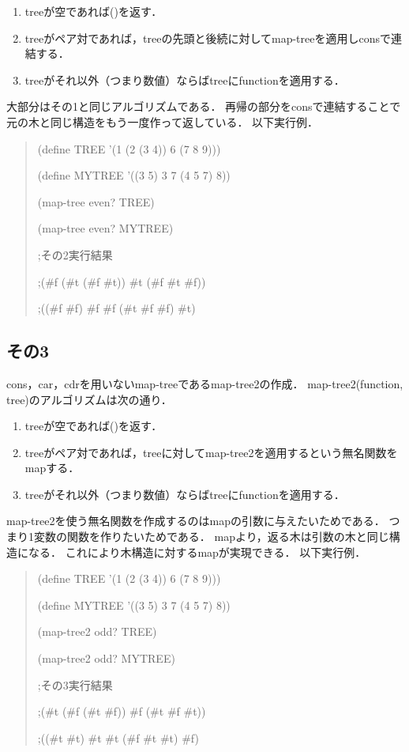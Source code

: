 \begin{enumerate}
\item treeが空であれば()を返す．
\item treeがペア対であれば，treeの先頭と後続に対してmap-treeを適用しconsで連結する．
\item treeがそれ以外（つまり数値）ならばtreeにfunctionを適用する．
\end{enumerate}

大部分はその1と同じアルゴリズムである．
再帰の部分をconsで連結することで元の木と同じ構造をもう一度作って返している．
以下実行例．

\begin{quote}

  (define TREE '(1 (2 (3 4)) 6 (7 8 9)))
  
  (define MYTREE '((3 5) 3 7 (4 5 7) 8))
  
  (map-tree even? TREE)
  
  (map-tree even? MYTREE)
  
  ;その2実行結果
  
  ;(\#f (\#t (\#f \#t)) \#t (\#f \#t \#f))
  
  ;((\#f \#f) \#f \#f (\#t \#f \#f) \#t)
  
\end{quote}

\subsection{その3}
cons，car，cdrを用いないmap-treeであるmap-tree2の作成．
map-tree2(function, tree)のアルゴリズムは次の通り．

\begin{enumerate}
\item treeが空であれば()を返す．
\item treeがペア対であれば，treeに対してmap-tree2を適用するという無名関数をmapする．
\item treeがそれ以外（つまり数値）ならばtreeにfunctionを適用する．
\end{enumerate}

map-tree2を使う無名関数を作成するのはmapの引数に与えたいためである．
つまり1変数の関数を作りたいためである．
mapより，返る木は引数の木と同じ構造になる．
これにより木構造に対するmapが実現できる．
以下実行例．

\begin{quote}

  (define TREE '(1 (2 (3 4)) 6 (7 8 9)))
  
  (define MYTREE '((3 5) 3 7 (4 5 7) 8))

  (map-tree2 odd? TREE)
  
  (map-tree2 odd? MYTREE)
  
  ;その3実行結果
  
  ;(\#t (\#f (\#t \#f)) \#f (\#t \#f \#t))
  
  ;((\#t \#t) \#t \#t (\#f \#t \#t) \#f)

\end{quote}

